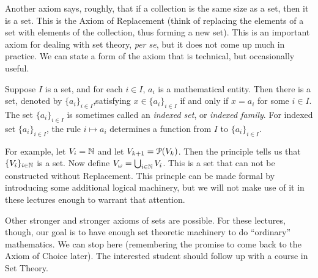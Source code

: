 Another axiom says, roughly, that if a collection is the same size as a set, then it is a set. 
This is the Axiom of Replacement (think of replacing the elements of a set with elements of the collection, thus forming a new set). 
This is an important axiom for dealing with set theory, \emph{per se}, but it does not come up much in practice. 
We can state a form of the axiom that is technical, but occasionally useful.

\begin{principle}
	Suppose $I$ is a set, and for each $i\in I$, $a_i$ is a mathematical entity. Then there is a set, denoted by $\{a_i\}_{i\in I}$,satisfying $x\in \{a_i\}_{i\in I}$ if and only if $x=a_i$ for some $i\in I$. The set $\{a_i\}_{i\in I}$ is sometimes called an \emph{indexed set},
	or \emph{indexed family}. For indexed set $\{a_i\}_{i\in I}$, the rule $i\mapsto a_i$ determines a function from $I$ to $\{a_i\}_{i\in I}$.
\end{principle}

For example, let $V_i = \mathbb N$ and let $V_{k+1} = {\mathcal{P}}(V_k)$. Then the principle tells us that $\{V_i\}_{i\in \mathbb N}$ is a set.
Now define $V_\omega = \bigcup_{i\in \mathbb N}V_i$. This is a set that can not be constructed without Replacement. 
This princple can be made formal by introducing some additional logical machinery, but we will not make use of it in these lectures enough to warrant that attention.

Other stronger and stronger axioms of sets are possible. 
For these lectures, though, our goal is to have enough set theoretic machinery to do ``ordinary'' mathematics. 
We can stop here (remembering the promise to come back to the Axiom of Choice later). 
The interested student should follow up with a course in Set Theory.

